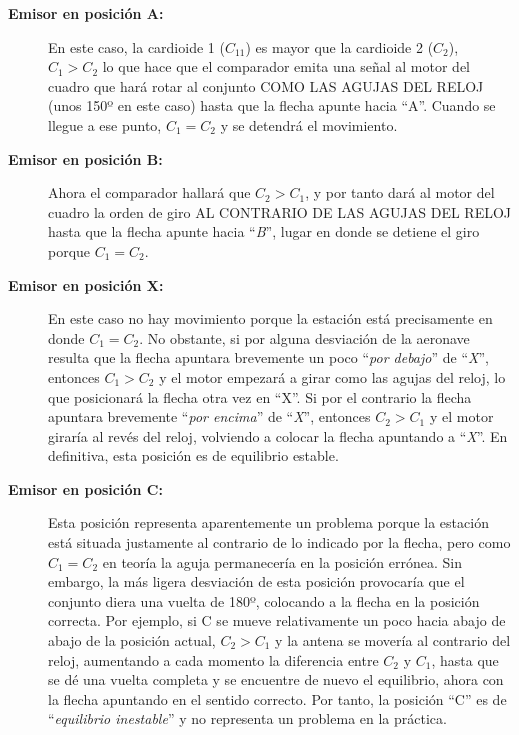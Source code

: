 \begin{description}
\item[\bf Emisor en posici\'on A:] En este caso, la cardioide 1 ($C_11$) es mayor que la cardioide 2 ($C_2$), $C_1 > C_2$ lo que hace que el comparador emita una se\~nal al motor del cuadro que har\'a rotar al conjunto COMO LAS AGUJAS DEL RELOJ (unos 150º en este caso) hasta que la flecha apunte hacia ``A''. Cuando se llegue a ese punto, $C_1=C_2$ y se detendr\'a el movimiento.


\item[\bf Emisor en posici\'on B:] Ahora el comparador hallar\'a que $C_2 > C_1$, y por tanto dar\'a al motor del cuadro la orden de giro AL CONTRARIO DE LAS AGUJAS DEL RELOJ hasta que la flecha apunte hacia ``\emph{B}'', lugar en donde se detiene el giro porque $C_1 = C_2$.
    

\item[\bf Emisor en posici\'on X:] En este caso no hay movimiento porque la estaci\'on est\'a precisamente en donde $C_1 = C_2$. No obstante, si por alguna desviaci\'on de la aeronave resulta que la flecha apuntara brevemente un poco ``\emph{por debajo}'' de ``\emph{X}'', entonces $C_1 > C_2$ y el motor empezar\'a a girar como las agujas del reloj, lo que posicionar\'a la flecha otra vez en ``X''. Si por el contrario la flecha apuntara brevemente ``\emph{por encima}'' de ``\emph{X}'', entonces $C_2 > C_1$ y el motor girar\'ia al rev\'es del reloj, volviendo a colocar la flecha apuntando a ``\emph{X}''. En definitiva, esta posici\'on es de equilibrio estable.


\item[\bf Emisor en posici\'on C:] Esta posici\'on representa aparentemente un problema porque la estaci\'on est\'a situada justamente al contrario de lo indicado por la flecha, pero como $C_1 = C_2$ en teor\'ia la aguja permanecer\'ia en la posici\'on err\'onea. Sin embargo, la m\'as ligera desviaci\'on de esta posici\'on provocar\'ia que el conjunto diera una vuelta de 180º, colocando a la flecha en la posici\'on correcta. Por ejemplo, si C se mueve relativamente un poco hacia abajo de abajo de la posici\'on actual, $C_2 > C_1$ y la antena se mover\'ia al contrario del reloj, aumentando a cada momento la diferencia entre $C_2$ y $C_1$, hasta que se d\'e una vuelta completa y se encuentre de nuevo el equilibrio, ahora con la flecha apuntando en el sentido correcto. Por tanto, la posici\'on ``C'' es de ``\emph{equilibrio inestable}'' y no representa un problema en la pr\'actica.
 
\end{description}
    


